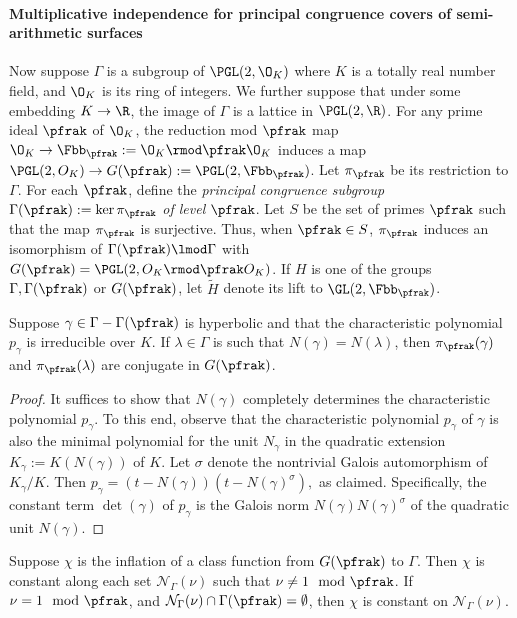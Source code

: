 \documentclass[11pt]{amsart}
\begin{document}
\paragraph{Multiplicative independence for principal congruence covers of semi-arithmetic surfaces}

Now suppose $\Gamma$ is a subgroup of $\PGL(2,\O_K)$  where $K$ is a totally real number field, and $\O_K$ is its ring of integers.
We further suppose that under some embedding $K\to \R$, the image of $\Gamma$ is a lattice in $\PGL(2,\R)$.
For any prime ideal $\pfrak$ of $\O_K$, the reduction mod $\pfrak$ map $\O_K \to \Fbb_\pfrak:=\O_K \rmod \pfrak \O_K$ induces a map $\PGL(2,O_K)\to G(\pfrak):=\PGL(2,\Fbb_\pfrak)$.
Let $\pi_\pfrak$ be its restriction to $\Gamma$.
For each $\pfrak$, define the \emph{principal congruence subgroup}  $\Gamma(\pfrak) := \ker \pi_\pfrak$ \emph{of level $\pfrak$}.
Let $S$ be the set of primes $\pfrak$ such that the map $\pi_\pfrak$ is surjective.
Thus, when $\pfrak \in S$, $\pi_\pfrak$ induces an isomorphism of $\Gamma(\pfrak) \lmod \Gamma$ with $G(\pfrak)=\PGL(2,O_K\rmod \pfrak O_K)$.
If $H$ is one of the groups $\Gamma,\Gamma(\pfrak)$ or $G(\pfrak)$, let $\tilde{H}$ denote its lift to $\GL(2,\Fbb_{\pfrak})$.


\begin{thm}
	Suppose $\gamma\in \Gamma - \Gamma(\pfrak)$ is hyperbolic and that the characteristic polynomial $p_{\gamma}$ is irreducible over $K$.
	If $\lambda \in \Gamma$ is such that $N(\gamma)=N(\lambda)$, then $\pi_{\pfrak}(\gamma)$ and $\pi_{\pfrak}(\lambda)$ are conjugate in $G(\pfrak)$.
\end{thm}

\begin{proof}
	It suffices to show that $N(\gamma)$ completely determines the characteristic polynomial $p_{\gamma}$.
	To this end, observe that the characteristic polynomial $p_{\gamma}$ of $\gamma$ is also the minimal polynomial for the unit $N_{\gamma}$ in the quadratic extension $K_{\gamma}:= K(N(\gamma))$ of $K$.
	Let $\sigma$ denote the nontrivial Galois automorphism of $K_{\gamma}/K$.
	Then $p_{\gamma}=(t-N(\gamma))(t-N(\gamma)^{\sigma}),$ as claimed.
	Specifically, the constant term $\det(\gamma)$ of $p_{\gamma}$ is the Galois norm $N(\gamma)N(\gamma)^{\sigma}$ of the quadratic unit $N(\gamma)$.
\end{proof}

\begin{corollary}
	Suppose $\chi$ is the inflation of a class function from $G(\pfrak)$ to $\Gamma$.
	Then $\chi$ is constant along each set $\mathcal{N}_{\Gamma}(\nu)$ such that $\nu \neq 1 \mod \pfrak$.
	If $\nu=1 \mod \pfrak$,  and $\mathcal{N}_{\Gamma}(\nu)\cap \Gamma(\pfrak)= \emptyset$, then $\chi$ is constant on $\mathcal{N}_{\Gamma}(\nu)$.
\end{corollary}
\end{document}
